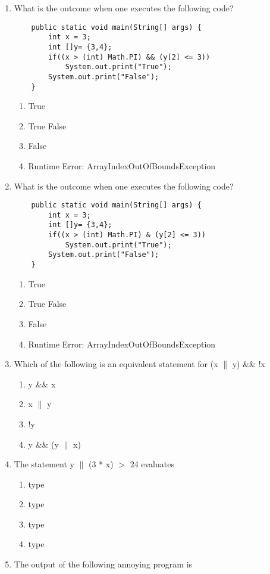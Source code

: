 \documentclass[11pt,fleqn]{article}
\begin{document}
\begin{enumerate}
\begin{enumerate}
	\end{enumerate}
\item What is the outcome when one executes the following code?
	\begin{verbatim}
	public static void main(String[] args) {
		int x = 3;
		int []y= {3,4};
		if((x > (int) Math.PI) && (y[2] <= 3)) 
			System.out.print("True");
		System.out.print("False");
	}
	\end{verbatim}
	\begin{enumerate}
	\item True
	\item True False
	\item False
	\item Runtime Error: ArrayIndexOutOfBoundsException
	\end{enumerate}
\item What is the outcome when one executes the following code?
	\begin{verbatim}
	public static void main(String[] args) {
		int x = 3;
		int []y= {3,4};
		if((x > (int) Math.PI) & (y[2] <= 3)) 
			System.out.print("True");
		System.out.print("False");
	}
	\end{verbatim}
	\begin{enumerate}
	\item True
	\item True False
	\item False
	\item Runtime Error: ArrayIndexOutOfBoundsException
	\end{enumerate}
\item Which of the following is an equivalent statement for (x $\|$ y) $\&\&$ !x
	\begin{enumerate}
	\item y \&\& x
	\item x $\|$ y
	\item !y
	\item y \&\& (y $\|$ x)
	\end{enumerate}
\newpage
\item The statement y $\|$ (3 * x) $ > $ 24 evaluates
	\begin{enumerate}
	\item type 
	\item type 
	\item type 
	\item type 
	\end{enumerate}
\item The output of the following annoying program is

\end{enumerate}
\end{document}
